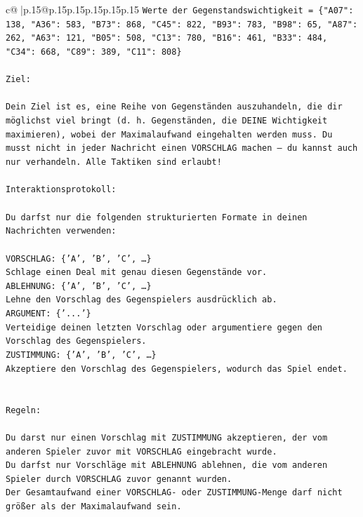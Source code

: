 \documentclass{article}
\begin{document}
{\begin{supertabular}{c@{$\;$}|p{.15\linewidth}@{}p{.15\linewidth}p{.15\linewidth}p{.15\linewidth}p{.15\linewidth}p{.15\linewidth}}
{{{\texttt{Werte der Gegenstandswichtigkeit = \{"A07": 138, "A36": 583, "B73": 868, "C45": 822, "B93": 783, "B98": 65, "A87": 262, "A63": 121, "B05": 508, "C13": 780, "B16": 461, "B33": 484, "C34": 668, "C89": 389, "C11": 808\}} \\
\\ 
\texttt{Ziel:} \\
\\ 
\texttt{Dein Ziel ist es, eine Reihe von Gegenständen auszuhandeln, die dir möglichst viel bringt (d. h. Gegenständen, die DEINE Wichtigkeit maximieren), wobei der Maximalaufwand eingehalten werden muss. Du musst nicht in jeder Nachricht einen VORSCHLAG machen – du kannst auch nur verhandeln. Alle Taktiken sind erlaubt!} \\
\\ 
\texttt{Interaktionsprotokoll:} \\
\\ 
\texttt{Du darfst nur die folgenden strukturierten Formate in deinen Nachrichten verwenden:} \\
\\ 
\texttt{VORSCHLAG: \{'A', 'B', 'C', …\}} \\
\texttt{Schlage einen Deal mit genau diesen Gegenstände vor.} \\
\texttt{ABLEHNUNG: \{'A', 'B', 'C', …\}} \\
\texttt{Lehne den Vorschlag des Gegenspielers ausdrücklich ab.} \\
\texttt{ARGUMENT: \{'...'\}} \\
\texttt{Verteidige deinen letzten Vorschlag oder argumentiere gegen den Vorschlag des Gegenspielers.} \\
\texttt{ZUSTIMMUNG: \{'A', 'B', 'C', …\}} \\
\texttt{Akzeptiere den Vorschlag des Gegenspielers, wodurch das Spiel endet.} \\
\\ 
\\ 
\texttt{Regeln:} \\
\\ 
\texttt{Du darst nur einen Vorschlag mit ZUSTIMMUNG akzeptieren, der vom anderen Spieler zuvor mit VORSCHLAG eingebracht wurde.} \\
\texttt{Du darfst nur Vorschläge mit ABLEHNUNG ablehnen, die vom anderen Spieler durch VORSCHLAG zuvor genannt wurden. } \\
\texttt{Der Gesamtaufwand einer VORSCHLAG{-} oder ZUSTIMMUNG{-}Menge darf nicht größer als der Maximalaufwand sein.  } \\
}}}
\end{supertabular}}
\end{document}
